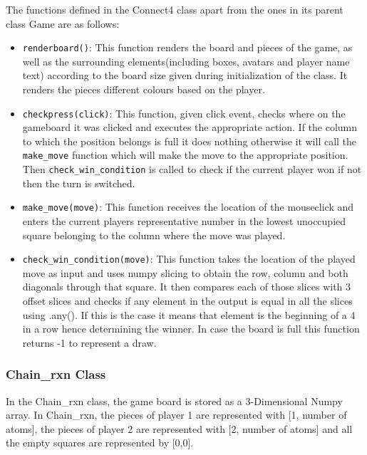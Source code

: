 \documentclass[12pt, letter]{article}
\begin{document}
The functions defined in the Connect4 class apart from the ones in its parent class Game are as follows:
\begin{itemize}
    \item \texttt{renderboard()}: This function renders the board and pieces of the game, as well as the surrounding elements(including boxes, avatars and player name text) according to the board size given during initialization of the class. It renders the pieces different colours based on the player.
    \item \texttt{checkpress(click)}: This function, given click event, checks where on the gameboard it was clicked and executes the appropriate action. If the column to which the position belongs is full it does nothing otherwise  it will call the \texttt{make\_move} function which will make the move to the appropriate position. Then \texttt{check\_win\_condition} is called to check if the current player won if not then the turn is switched.
    \item  \texttt{make\_move(move)}: This function receives the location of the mouseclick and enters the current players representative number in the lowest unoccupied square belonging to the column where the move was played.
    \item \texttt{check\_win\_condition(move)}: This function takes the location of the played move as input and uses numpy slicing to obtain the row, column and both diagonals through that square. It then compares each of those slices with 3 offset slices and checks if any element in the output is equal in all the slices using .any(). If this is the case it means that element is the beginning of a 4 in a row hence determining the winner. In case the board is full this function returns -1 to represent a draw.
\end{itemize}

\subsubsection{Chain\_rxn Class}
In the Chain\_rxn class, the game board is stored as a 3-Dimensional Numpy array. In Chain\_rxn, the pieces of player 1 are represented with [1, number of atoms], the pieces of player 2 are represented with [2, number of atoms] and all the empty squares are represented by [0,0].
\end{document}
